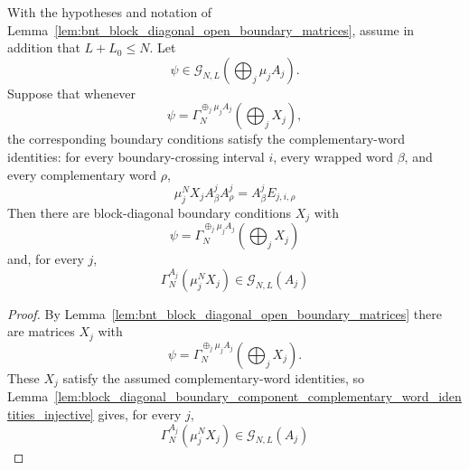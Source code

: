 \begin{lemma}
    \label{lem:block_diagonal_boundary_periodic_components_from_complementary_identities}
    \leanok
    With the hypotheses and notation of
    Lemma~\ref{lem:bnt_block_diagonal_open_boundary_matrices}, assume in
    addition that \(L+L_0\le N\).  Let
    \[
        \psi\in
        \mathcal G_{N,L}\!\left(\bigoplus_j\mu_jA_j\right).
    \]
    Suppose that whenever
    \[
        \psi=\Gamma_N^{\oplus_j\mu_jA_j}\!\left(\bigoplus_jX_j\right),
    \]
    the corresponding boundary conditions satisfy the complementary-word
    identities: for every boundary-crossing interval \(i\), every wrapped
    word \(\beta\), and every complementary word \(\rho\),
    \[
        \mu_j^N X_jA^j_\beta A^j_\rho=A^j_\beta E_{j,i,\rho}
    \]
    Then there are block-diagonal boundary conditions \(X_j\) with
    \[
        \psi=\Gamma_N^{\oplus_j\mu_jA_j}\!\left(\bigoplus_jX_j\right)
    \]
    and, for every \(j\),
    \[
        \Gamma_N^{A_j}(\mu_j^NX_j)\in\mathcal G_{N,L}(A_j)
    \]
\end{lemma}

\begin{proof}
    \leanok
    By Lemma~\ref{lem:bnt_block_diagonal_open_boundary_matrices} there are
    matrices \(X_j\) with
    \[
        \psi=\Gamma_N^{\oplus_j\mu_jA_j}\!\left(\bigoplus_jX_j\right).
    \]
    These \(X_j\) satisfy the assumed complementary-word identities, so
    Lemma~\ref{lem:block_diagonal_boundary_component_complementary_word_identities_injective}
    gives, for every \(j\),
    \[
        \Gamma_N^{A_j}(\mu_j^NX_j)\in\mathcal G_{N,L}(A_j)
    \]
\end{proof}
